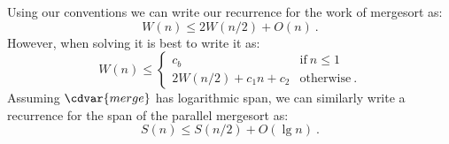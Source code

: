 \begin{example}
Using our conventions we can write our recurrence for the work of
mergesort as:
\[W(n) \leq 2W(n/2) + O(n)~.\]
However, when solving it is best to write it as:
\[
W(n) \leq \left\{
\begin{array}{lll}
c_b & \mbox{if}~n \leq 1
\\
2W(n/2) + c_1 n + c_2 & \mbox{otherwise} ~.
\end{array}
\right. 
\]
Assuming $\cdvar{merge}$ has logarithmic span, we can similarly write
a recurrence for the span of the parallel mergesort as:
\[S(n) \leq S(n/2) + O(\lg n)~.\]
\end{example}





